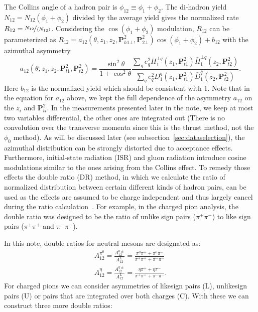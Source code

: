 The Collins angle of a hadron pair is $\phi_{12} \equiv \phi_1+\phi_2$. The di-hadron yield $N_{12}=N_{12}(\phi_1+\phi_2)$ divided by the average yield gives the normalized rate $R_{12}=\nicefrac{N_{12}}{\langle  N_{12}\rangle}$. Considering the $\cos(\phi_1+\phi_2)$ modulation, $R_{12}$ can be parameterized as $R_{12}=a_{12}(\theta,z_1,z_2, \boldsymbol{P}^2_{h1\bot},\boldsymbol{P}^2_{2\bot})\cos(\phi_1+\phi_2)+b_{12}$ with the azimuthal asymmetry
\begin{equation}
a_{12}(\theta,z_1,z_2, \boldsymbol{P}^2_{t1},\boldsymbol{P}^2_{t2})=\frac{\sin^2\theta}{1+\cos^2\theta}
\frac{\sum\limits_{q}e^2_qH^{\bot q}_1(z_1,\boldsymbol{P}^2_{t1})\bar{H}^{\bot q}_1(z_2,\boldsymbol{P}^2_{t2})}{\sum\limits_{q}e^2_qD^q_1(z_1,\boldsymbol{P}^2_{t1})\bar{D}^{\bar{q}}_1(z_2,\boldsymbol{P}^2_{t2})}.
\end{equation} 
Here $b_{12}$ is the normalized yield which should be consistent with 1.
Note that in the equation for $a_{12}$ above, we kept the full dependence of the asymmetry $a_{12}$ on the $z_i$ and $ \boldsymbol{P}^2_{ti}$. In the measurements presented later in the note, we keep at most two variables differential, the other ones are integrated out (There is no convolution over the transverse momenta since this is the thrust method, not the $\phi_0$ method).
As will be discussed later (see subsection~\ref{sec:dataselection}), the azimuthal distribution can be strongly distorted due to acceptance effects. Furthermore, initial-state radiation (ISR) and gluon radiation introduce cosine modulations similar to the ones arising from the Collins effect. To remedy those effects the double ratio (DR) method, in which we calculate the ratio of normalized distribution between certain different kinds of hadron pairs, can be used as the effects are assumed to be charge independent and thus largely cancel during the ratio calculation~\cite{ChargedPionResult,CollinsInSIDISandEE}.  For example, in the charged pion analysis, the double ratio was designed to be the ratio of unlike sign pairs ($\pi^+\pi^-$) to like sign pairs ($\pi^+\pi^+$ and $\pi^-\pi^-$).


In this note, double ratios for neutral mesons are designated as:
\begin{equation}
\label{eqn:FF6}
\begin{aligned}
A_{12}^{\pi^0}=\frac{A^{0\pm}_{12}}{A^L_{12}}=\frac{\pi^0\pi^++\pi^0\pi^-}{\pi^+\pi^++\pi^-\pi^-}\\
A_{12}^{\eta}=\frac{A^{\eta\pm}_{12}}{A^L_{12}}=\frac{\eta\pi^++\eta\pi^-}{\pi^+\pi^++\pi^-\pi^-}.
\end{aligned}
\end{equation}
For charged pions we can consider asymmetries of likesign pairs (L), unlikesign pairs (U) or pairs that are integrated over both charges (C).
With these we can construct three more double ratios:

